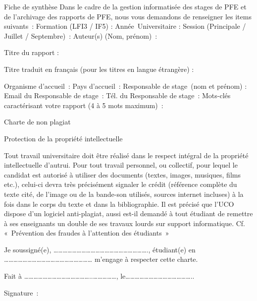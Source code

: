 Fiche de synthèse
Dans le cadre de la gestion informatisée des stages de PFE et de l’archivage des rapports de PFE, nous vous demandons de renseigner les items suivants : 
Formation (LFI3 / IF5) :
Année Universitaire : 
Session (Principale / Juillet / Septembre) :
Auteur(s)  (Nom, prénom) : 


Titre du rapport :

Titre traduit en français (pour les titres en langue étrangère) : 

Organisme d’accueil : 
Pays d’accueil : 
Responsable de stage (nom et prénom) : 
Email du Responsable de stage : 
Tél. du Responsable de stage :
Mots-clés caractérisant votre rapport (4 à 5 mots maximum) : 

Charte de non plagiat

\clearpage

Protection de la propriété intellectuelle

Tout travail universitaire doit être réalisé dans le respect intégral de la propriété intellectuelle d’autrui. Pour tout travail personnel, ou collectif, pour lequel le candidat est autorisé à utiliser des documents (textes, images, musiques, films etc.), celui-ci devra très précisément signaler le crédit (référence complète du texte cité, de l’image ou de la bande-son utilisés, sources internet incluses) à la fois dans le corps du texte et dans la bibliographie. Il est précisé que l’UCO dispose d’un logiciel anti-plagiat, aussi est-il demandé à tout étudiant de remettre à ses enseignants un double de ses travaux lourds sur support informatique.
Cf. « Prévention des fraudes à l’attention des étudiants »


Je soussigné(e), ……………………………………………………., étudiant(e) en …………………………………………………     m’engage à respecter cette charte.


Fait à ……………………………………..……………, le……………………………………..


Signature : 
